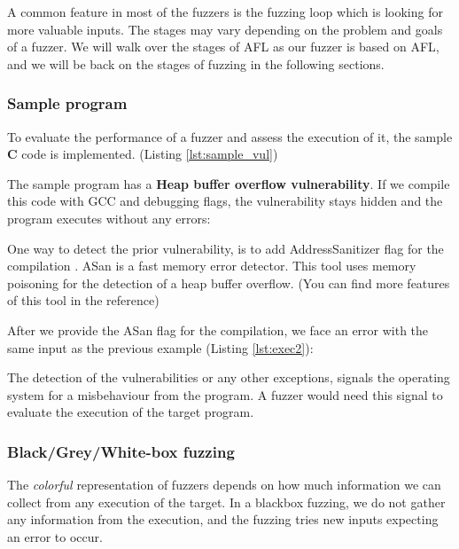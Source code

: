 A common feature in most of the fuzzers is the fuzzing loop which is looking for more valuable inputs. The stages may vary depending on the problem and goals of a fuzzer. We will walk over the stages of AFL as our fuzzer is based on AFL, and we will be back on the stages of fuzzing in the following sections.

\subsubsection*{Sample program}
To evaluate the performance of a fuzzer and assess the execution of it, the sample \textbf{C} code is implemented. (Listing \ref{lst:sample_vul}) \cite{sample_code_ref}



The sample program has a \textbf{Heap buffer overflow vulnerability}. If we compile this code with GCC and debugging flags, the vulnerability stays hidden and the program executes without any errors:



One way to detect the prior vulnerability, is to add AddressSanitizer flag for the compilation \cite{address_san}. ASan is a fast memory error detector. This tool uses memory poisoning for the detection of a heap buffer overflow. (You can find more features of this tool in the reference) \cite{serebryany2012addresssanitizer}

After we provide the ASan flag for the compilation, we face an error with the same input as the previous example (Listing \ref{lst:exec2}):



The detection of the vulnerabilities or any other exceptions, signals the operating system for a misbehaviour from the program. A fuzzer would need this signal to evaluate the execution of the target program.

\subsubsection*{Black/Grey/White-box fuzzing}

The \textit{colorful} representation of fuzzers depends on how much information we can collect from any execution of the target. In a blackbox fuzzing, we do not gather any information from the execution, and the fuzzing tries new inputs expecting an error to occur.

